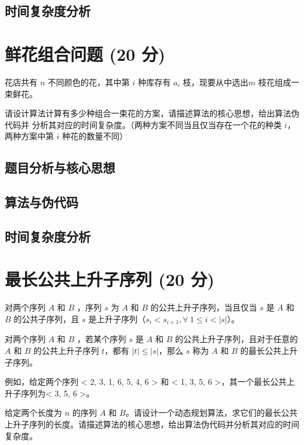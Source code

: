 \documentclass{article}
\begin{document}
\subsection{时间复杂度分析}


\section{鲜花组合问题 (20 分)}

花店共有 $n$ 不同颜色的花，其中第 $i$ 种库存有 $a_i$ 枝，现要从中选出$m$ 枝花组成一束鲜花。

请设计算法计算有多少种组合一束花的方案，请描述算法的核心思想，给出算法伪代码并
分析其对应的时间复杂度。（两种方案不同当且仅当存在一个花的种类 $i$，两种方案中第 $i$ 种花的数量不同）

\subsection{题目分析与核心思想}

\subsection{算法与伪代码}

\subsection{时间复杂度分析}


\section{最长公共上升子序列 (20 分)}

对两个序列 $A$ 和 $B$ ，序列 $s$ 为 $A$ 和 $B$ 的公共上升子序列，当且仅当 $s$ 是 $A$ 和 $B$ 的公共子序列，且 $s$ 是上升子序列（$s_i < s_{i+1}, \forall \ 1 \le i < |s|$）。

对两个序列 $A$ 和 $B$ ，若某个序列 $s$ 是 $A$ 和 $B$ 的公共上升子序列，且对于任意的 $A$ 和 $B$ 的公共上升子序列 $t$，都有 $|t| \le |s|$，那么 $s$ 称为 $A$ 和 $B$ 的最长公共上升子序列。

例如，给定两个序列 < 2, 3, 1, 6, 5, 4, 6 > 和 < 1, 3, 5, 6 >，其一个最长公共上升子序列为< 3, 5, 6 >。

给定两个长度为 $n$ 的序列 $A$ 和 $B$。请设计一个动态规划算法，求它们的最长公共上升子序列的长度。请描述算法的核心思想，给出算法伪代码并分析其对应的时间复杂度。
\end{document}
